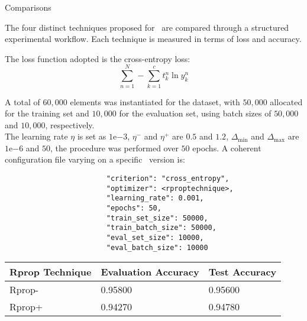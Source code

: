\begin{section}{Comparisons}
    \par The four distinct techniques proposed for~ are compared through a structured experimental workflow. Each technique is measured in terms of loss and accuracy.
    \par The loss function adopted is the cross-entropy loss:
    \[
        \sum_{n=1}^{N} - \sum_{k=1}^{c} t_{k}^{n} \ln y_{k}^{n}
    \]
    \par A total of $60,000$ elements was instantiated for the dataset, with $50,000$ allocated for the training set and $10,000$ for the evaluation set, using batch sizes of $50,000$ and $10,000$, respectively.\\
    The learning rate $\eta$ is set as $1\mathrm{e}{-3}$, $\eta^{-}$ and $\eta^{+}$ are $0.5$ and $1.2$, $\Delta_{\min}$ and $\Delta_{\max}$ are $1\mathrm{e}{-6}$ and $50$, the procedure was performed over $50$ epochs. A coherent configuration file varying on a specific~ version is:\\
    \begin{verbatim}
                        "criterion": "cross_entropy",
                        "optimizer": <rproptechnique>,
                        "learning_rate": 0.001,
                        "epochs": 50,
                        "train_set_size": 50000,
                        "train_batch_size": 50000,
                        "eval_set_size": 10000,
                        "eval_batch_size": 10000
    \end{verbatim}
    \clearpage
    
    
    \clearpage
    \begin{table}[htp]
        \centering
        \begin{tabular}{|p{4.3cm}|p{4.3cm}|p{4.3cm}|}
            \hline
            \multicolumn{1}{|c|}{\textbf{Rprop Technique}} & \multicolumn{1}{c|}{\textbf{Evaluation Accuracy}} & \multicolumn{1}{c|}{\textbf{Test Accuracy}} \\ \hline
            \hspace{1.5cm} Rprop-                  & \hspace{1.5cm} 0.95800 \hfill               & \hspace{1.5cm} 0.95600 \hfill                    \\
            \hspace{1.5cm} Rprop+                   & \hspace{1.5cm} 0.94270 \hfill               & \hspace{1.5cm} 0.94780 \hfill                    \\

\end{tabular}
\end{table}
\end{section}
